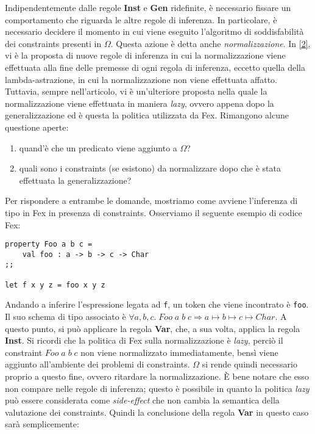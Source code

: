 \documentclass[10pt,a4paper]{article}
\begin{document}
Indipendentemente dalle regole \textbf{Inst} e \textbf{Gen} ridefinite, è necessario fissare un comportamento che
riguarda le altre regole di inferenza. In particolare, è necessario decidere il momento in cui viene eseguito l'algoritmo
di soddisfabilità dei constraints presenti in $ \Omega $. Questa azione è detta anche \textit{normalizzazione}.
In \hyperlink{bibl2}{[2]}, vi è la proposta di nuove regole di inferenza in cui la normalizzazione viene effettuata alla
fine delle premesse di ogni regola di inferenza, eccetto quella della lambda-astrazione, in cui la normalizzazione non viene
effettuata affatto. Tuttavia, sempre nell'articolo,
vi è un'ulteriore proposta nella quale la normalizzazione viene effettuata in maniera \textit{lazy}, ovvero appena dopo
la generalizzazione ed è questa la politica utilizzata da Fex. Rimangono alcune questione aperte:
\begin{enumerate}
    \item quand'è che un predicato viene aggiunto a $ \Omega $?
    \item quali sono i constraints (se esistono) da normalizzare dopo che è stata effettuata la generalizzazione?
\end{enumerate}
Per rispondere a entrambe le domande, mostriamo come avviene l'inferenza di tipo in Fex in presenza di constraints.
Osserviamo il seguente esempio di codice Fex:
\begin{lstlisting}
property Foo a b c =
    val foo : a -> b -> c -> Char
;;

let f x y z = foo x y z
\end{lstlisting}
Andando a inferire l'espressione legata ad \texttt{f}, un token che viene incontrato è \texttt{foo}. Il suo schema di
tipo associato è $ \forall a, b, c. \; Foo \; a \; b \; c \Rightarrow a \mapsto b \mapsto c \mapsto Char $. A questo
punto, si può applicare la regola \textbf{Var}, che, a sua volta, applica la regola
\textbf{Inst}. Si ricordi che la politica di Fex sulla normalizzazione è \textit{lazy}, perciò
il constraint $ Foo \; a \; b \; c $ non viene normalizzato immediatamente, bensì viene aggiunto all'ambiente dei
problemi di constraints. $ \Omega $ si rende quindi necessario proprio a questo fine, ovvero ritardare la normalizzazione.
\`E bene notare che esso non compare nelle regole di inferenza; questo è possibile in quanto la politica \textit{lazy}
può essere considerata come \textit{side-effect} che non cambia la semantica della valutazione dei constraints.
Quindi la conclusione della regola \textbf{Var} in questo caso sarà semplicemente:
\end{document}
